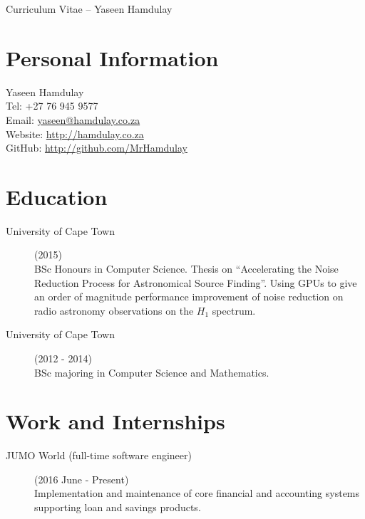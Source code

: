 \documentclass[margin,line,a4paper]{resume}
\begin{document}
    {\sc \Large Curriculum Vitae -- Yaseen Hamdulay}
    \begin{resume}
        \vspace{0.5cm}

        \section{\mysidestyle Personal Information}
            Yaseen Hamdulay\\
            Tel: +27 76 945 9577\\
            Email: \href{mailto:yaseen@hamdulay.co.za}{yaseen@hamdulay.co.za}\\
            Website: \href{http://hamdulay.co.za}{http://hamdulay.co.za}\\
            GitHub: \href{http://github.com/MrHamdulay}{http://github.com/MrHamdulay}\\

        \section{\mysidestyle Education}
            \begin{description}
                \item[University of Cape Town] (2015) \\
                    BSc Honours in Computer Science. Thesis on ``Accelerating the Noise Reduction Process for Astronomical Source Finding''.
                    Using GPUs to give an order of magnitude performance improvement of noise reduction on radio astronomy observations on the $H_1$ spectrum.

                \item[University of Cape Town] (2012 - 2014) \\
                    BSc majoring in Computer Science and Mathematics.
            \end{description}


        \section{\mysidestyle Work and Internships}
            \begin{description}

              \item[JUMO World (full-time software engineer)] (2016 June - Present) \\
                Implementation and maintenance of core financial and accounting systems supporting loan and savings products.


\end{description}
\end{resume}
\end{document}
